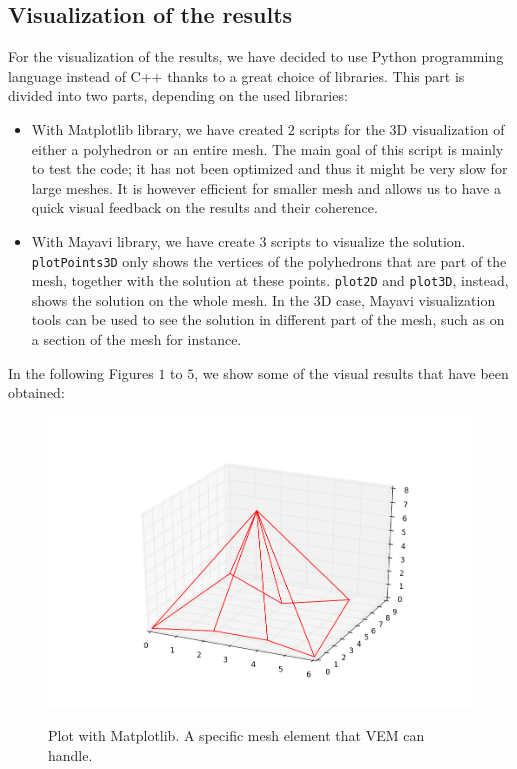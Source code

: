 \subsection{Visualization of the results}
For the visualization of the results, we have decided to use Python programming language instead of C++ thanks to a great choice of libraries. This part is divided into two parts, depending on the used libraries:
\begin{itemize}
\item With Matplotlib library, we have created $2$ scripts for the $3$D visualization of either a polyhedron or an entire mesh. The main goal of this script is mainly to test the code; it has not been optimized and thus it might be very slow for large meshes. It is however efficient for smaller mesh and allows us to have a quick visual feedback on the results and their coherence. 
\item With Mayavi library, we have create $3$ scripts to visualize the solution. \verb|plotPoints3D| only shows the vertices of the polyhedrons that are part of the mesh, together with the solution at these points. \verb|plot2D| and \verb|plot3D|, instead, shows the solution on the whole mesh. In the $3$D case, Mayavi visualization tools can be used to see the solution in different part of the mesh, such as on a section of the mesh for instance. 
\end{itemize}

In the following Figures $1$ to $5$, we show some of the visual results that have been obtained:

\begin{figure}[!h]
\label{img:matplotlibPolyhedron}
\centering
\includegraphics[scale=0.4]{images/matplotlibTest5.png}\label{geom}
\caption{Plot with Matplotlib. A specific mesh element that VEM can handle.}
\end{figure}

